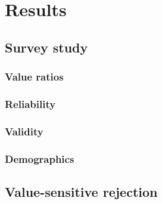 \chapter{Results}

\section{Survey study}
\label{sec:results-survey-study}

\subsection{Value ratios}

\subsection{Reliability}

\subsection{Validity}

\subsection{Demographics}

\section{Value-sensitive rejection}
